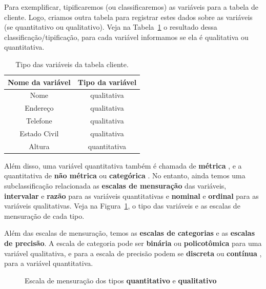 \documentclass[a4paper,12pt]{book}
\begin{document}
Para exemplificar, tipificaremos (ou classificaremos) as variáveis para a tabela de cliente. Logo, criamos outra tabela para registrar estes dados sobre as variáveis (se quantitativo ou qualitativo). Veja na Tabela~\ref{tbl:clienteclassificacao} o resultado dessa classificação/tipificação, para cada variável informamos se ela é qualitativa ou quantitativa.

\begin{table}
	\centering
	\caption{Tipo das variáveis da tabela cliente.}
	\begin{tabular}{|c|c|}
		\hline
		\textbf{Nome da variável} &\textbf{Tipo da variável} \\
		\hline
		Nome & qualitativa \\
		\hline
		Endereço & qualitativa \\
		\hline
		Telefone & qualitativa \\
		\hline
		Estado Civil & qualitativa \\
		\hline
		Altura & quantitativa \\
		\hline
	\end{tabular}
	\label{tbl:clienteclassificacao}
\end{table}

Além disso, uma variável quantitativa também é chamada de \textbf{métrica} , e a quantitativa de \textbf{não métrica} ou \textbf{categórica} \cite{favero2017manual}. No entanto, ainda temos uma subclassificação relacionada as \textbf{escalas de mensuração} das variáveis, \textbf{intervalar} e \textbf{razão} para as variáveis quantitativas e \textbf{nominal} e \textbf{ordinal} para as variáveis qualitativas. Veja na Figura~\ref{fig:mensuracao}, o tipo das variáveis e as escalas de mensuração de cada tipo.

Além das escalas de mensuração, temos as \textbf{escalas de categorias} e as \textbf{escalas de precisão}. A escala de categoria pode ser \textbf{binária} ou \textbf{policotômica} para uma variável qualitativa, e para a escala de precisão podem se \textbf{discreta} ou \textbf{contínua
}, para a variável quantitativa.

\begin{figure}
	\caption{Escala de mensuração dos tipos \textbf{quantitativo} e \textbf{qualitativo}}
	\centering
	\label{fig:mensuracao}
\end{figure}
\end{document}
